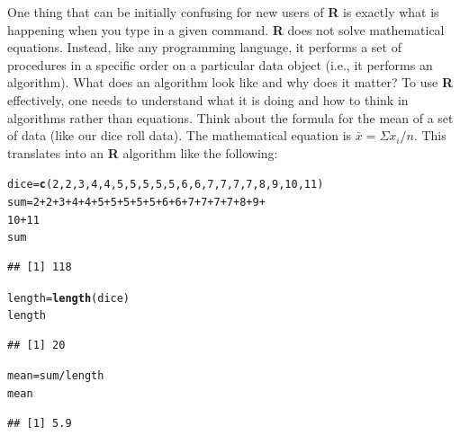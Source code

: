 \documentclass[12pt]{article}\usepackage[]{graphicx}\usepackage[]{color}
\makeatletter
\newcommand{\hlnum}[1]{\textcolor[rgb]{0.686,0.059,0.569}{#1}}%
\newcommand{\hlopt}[1]{\textcolor[rgb]{0,0,0}{#1}}%
\newcommand{\hlstd}[1]{\textcolor[rgb]{0.345,0.345,0.345}{#1}}%
\newcommand{\hlkwb}[1]{\textcolor[rgb]{0.69,0.353,0.396}{#1}}%
\newcommand{\hlkwd}[1]{\textcolor[rgb]{0.737,0.353,0.396}{\textbf{#1}}}%
\newenvironment{kframe}{%
 \def\at@end@of@kframe{}%
 \ifinner\ifhmode%
  \def\at@end@of@kframe{\end{minipage}}%
  \begin{minipage}{\columnwidth}%
 \fi\fi%
 \def\FrameCommand##1{\hskip\@totalleftmargin \hskip-\fboxsep
 \colorbox{shadecolor}{##1}\hskip-\fboxsep
     \hskip-\linewidth \hskip-\@totalleftmargin \hskip\columnwidth}%
 \MakeFramed {\advance\hsize-\width
   \@totalleftmargin\z@ \linewidth\hsize
   \@setminipage}}%
 {\par\unskip\endMakeFramed%
 \at@end@of@kframe}
\newenvironment{knitrout}{}{} %
\makeatother
\begin{document}
One thing that can be initially confusing for new users of \textbf{R} is exactly what is happening when you type in a given command. \textbf{R} does not solve mathematical equations. Instead, like any programming language, it performs a set of procedures in a specific order on a particular data object (i.e., it performs an algorithm). What does an algorithm look like and why does it matter? To use \textbf{R} effectively, one needs to understand what it is doing and how to think in algorithms rather than equations. Think about the formula for the mean of a set of data (like our dice roll data). The mathematical equation is $\bar{x}=\Sigma x_{i} / n$. This translates into an \textbf{R} algorithm like the following:
\begin{knitrout}
\color{fgcolor}\begin{kframe}
\begin{alltt}
\hlstd{dice} \hlkwb{=} \hlkwd{c}\hlstd{(}\hlnum{2}\hlstd{,} \hlnum{2}\hlstd{,} \hlnum{3}\hlstd{,} \hlnum{4}\hlstd{,} \hlnum{4}\hlstd{,} \hlnum{5}\hlstd{,} \hlnum{5}\hlstd{,} \hlnum{5}\hlstd{,} \hlnum{5}\hlstd{,} \hlnum{5}\hlstd{,} \hlnum{6}\hlstd{,} \hlnum{6}\hlstd{,} \hlnum{7}\hlstd{,} \hlnum{7}\hlstd{,} \hlnum{7}\hlstd{,} \hlnum{7}\hlstd{,} \hlnum{8}\hlstd{,} \hlnum{9}\hlstd{,} \hlnum{10}\hlstd{,} \hlnum{11}\hlstd{)}
\hlstd{sum} \hlkwb{=} \hlnum{2} \hlopt{+} \hlnum{2} \hlopt{+} \hlnum{3} \hlopt{+} \hlnum{4} \hlopt{+} \hlnum{4} \hlopt{+} \hlnum{5} \hlopt{+} \hlnum{5} \hlopt{+} \hlnum{5} \hlopt{+} \hlnum{5} \hlopt{+} \hlnum{5} \hlopt{+} \hlnum{6} \hlopt{+} \hlnum{6} \hlopt{+} \hlnum{7} \hlopt{+} \hlnum{7} \hlopt{+} \hlnum{7} \hlopt{+} \hlnum{7} \hlopt{+} \hlnum{8} \hlopt{+} \hlnum{9} \hlopt{+}
    \hlnum{10} \hlopt{+} \hlnum{11}
\hlstd{sum}
\end{alltt}
\begin{verbatim}
## [1] 118
\end{verbatim}
\begin{alltt}
\hlstd{length} \hlkwb{=} \hlkwd{length}\hlstd{(dice)}
\hlstd{length}
\end{alltt}
\begin{verbatim}
## [1] 20
\end{verbatim}
\begin{alltt}
\hlstd{mean} \hlkwb{=} \hlstd{sum}\hlopt{/}\hlstd{length}
\hlstd{mean}
\end{alltt}
\begin{verbatim}
## [1] 5.9
\end{verbatim}
\end{kframe}
\end{knitrout}
\end{document}
